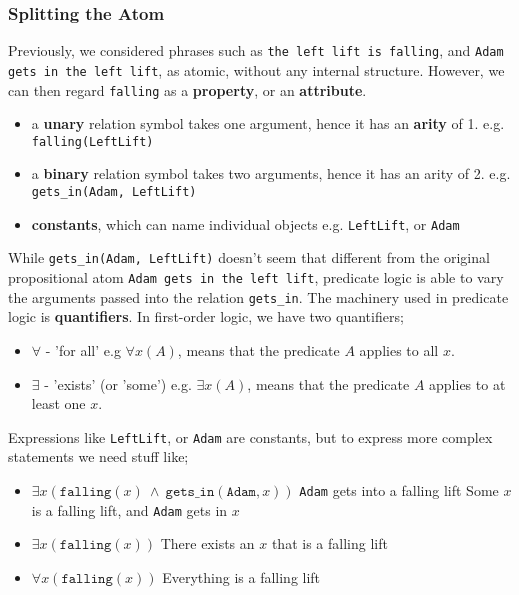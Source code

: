 \documentclass[a4paper, 12pt]{article}
\begin{document}
            \subsubsection*{Splitting the Atom}
                Previously, we considered phrases such as \texttt{the left lift is falling}, and \texttt{Adam gets in the left lift}, as atomic, without any internal structure. However, we can then regard \texttt{falling} as a \textbf{property}, or an \textbf{attribute}.
                \begin{itemize}
                    \itemsep0em
                    \item a \textbf{unary} relation symbol takes one argument, hence it has an \textbf{arity} of 1.
                        \subitem e.g. \texttt{falling(LeftLift)}
                    \item a \textbf{binary} relation symbol takes two arguments, hence it has an arity of 2.
                        \subitem e.g. \texttt{gets\_in(Adam, LeftLift)}
                    \item \textbf{constants}, which can name individual objects
                        \subitem e.g. \texttt{LeftLift}, or \texttt{Adam}
                \end{itemize}
                While \texttt{gets\_in(Adam, LeftLift)} doesn't seem that different from the original propositional atom \texttt{Adam gets in the left lift}, predicate logic is able to vary the arguments passed into the relation \texttt{gets\_in}. The machinery used in predicate logic is \textbf{quantifiers}. In first-order logic, we have two quantifiers;
                \begin{itemize}
                    \itemsep0em
                    \item $\forall$ - 'for all' \hfill e.g $\forall x (A)$, means that the predicate $A$ applies to all $x$.
                    \item $\exists$ - 'exists' (or 'some') \hfill e.g. $\exists x (A)$, means that the predicate $A$ applies to at least one $x$.
                \end{itemize}
                Expressions like \texttt{LeftLift}, or \texttt{Adam} are constants, but to express more complex statements we need stuff like;
                \begin{itemize}
                    \itemsep0em
                    \item $\exists x (\texttt{falling}(x)\ \land\ \texttt{gets\_in}(\texttt{Adam}, x))$ \hfill \texttt{Adam} gets into a falling lift
                        \subitem \hfill Some $x$ is a falling lift, and \texttt{Adam} gets in $x$
                    \item $\exists x (\texttt{falling}(x))$ \hfill There exists an $x$ that is a falling lift
                    \item $\forall x (\texttt{falling}(x))$ \hfill Everything is a falling lift
                \end{itemize}
\end{document}
